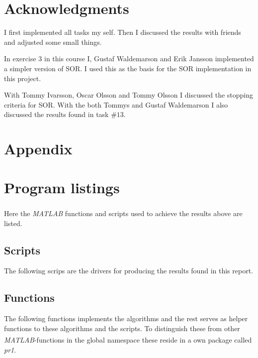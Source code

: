\documentclass[10pt, a4paper]{article}
\newcommand{\matlab}{\small{\emph{MATLAB\textsuperscript{\textregistered}}}}
\begin{document}
\section{Acknowledgments}
I first implemented all tasks my self. Then I discussed the results with friends and adjusted some small things.

In exercise $3$ in this course I, Gustaf Waldemarson and Erik Jansson implemented a simpler version of SOR. I used this as the basis for the SOR implementation in this project.

With Tommy Ivarsson, Oscar Olsson and Tommy Olsson I discussed the stopping criteria for SOR. With the both Tommys and Gustaf Waldemarson I also discussed the results found in task $\#13$.

{}


\newpage
\section*{Appendix}
\appendix
\section{Program listings} \label{appendix+programs}
Here the \matlab{} functions and scripts used to achieve the results above are listed.

\subsection{Scripts}
The following scrips are the drivers for producing the results found in this report.












\subsection{Functions}
The following functions implements the algorithms and the rest serves as helper functions to these algorithms and the scripts. To distinguish these from other \matlab{}-functions in the global namespace these reside in a own package called \emph{pr1}.











\end{document}
